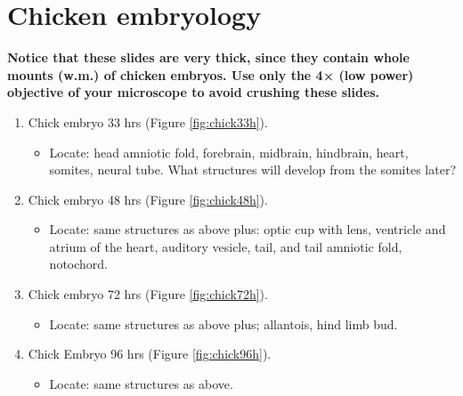 \section{Chicken embryology}\label{chicken-embryology}

\textbf{Notice that these slides are very thick, since they contain
whole mounts (w.m.) of chicken embryos. Use only the 4× (low power)
objective of your microscope to avoid crushing these slides.}

\begin{enumerate}
\def\labelenumi{\arabic{enumi}.}
\tightlist
\item
  Chick embryo 33 hrs (Figure \ref{fig:chick33h}).

\begin{itemize}
\tightlist
  \item
  Locate: head
  amniotic fold, forebrain, midbrain, hindbrain, heart, somites, neural
  tube. What structures will develop from the somites later?
\end{itemize}
\item
  Chick embryo 48 hrs (Figure \ref{fig:chick48h}).
  \begin{itemize}
  \tightlist
    \item
  Locate: same
  structures as above plus: optic cup with lens, ventricle and atrium of
  the heart, auditory vesicle, tail, and tail amniotic fold, notochord.
\end{itemize}
\item
  Chick embryo 72 hrs (Figure \ref{fig:chick72h}).
  \begin{itemize}
  \tightlist
    \item
  Locate: same
  structures as above plus; allantois, hind limb bud.
  \end{itemize}
\item
  Chick Embryo 96 hrs (Figure \ref{fig:chick96h}).
  \begin{itemize}
  \tightlist
    \item
  Locate: same
  structures as above.
  \end{itemize}
\end{enumerate}

